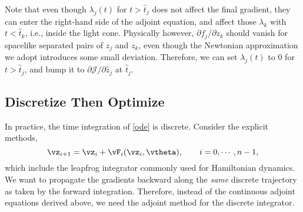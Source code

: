 \documentclass[modern, trackchanges, dvipsnames]{aastex631}
\newcommand{\p}{\partial}
\newcommand{\cJ}{\mathcal{J}}
\begin{document}
Note that even though $\lambda_j(t)$ for $t > \hat t_j$ does not affect
the final gradient, they can enter the right-hand side of the adjoint
equation, and affect those $\lambda_k$ with $t < \hat t_k$, i.e., inside
the light cone.
Physically however, $\p f_j / \p z_k$ should vanish for spacelike
separated pairs of $z_j$ and $z_k$, even though the Newtonian
approximation we adopt introduces some small deviation.
Therefore, we can set $\lambda_j(t)$ to 0 for $t > \hat t_j$, and bump
it to $\p\cJ / \p\hat z_j$ at $\hat t_j$.


\vspace{1em}
\subsection{Discretize Then Optimize}

In practice, the time integration of \eqref{ode} is discrete.
Consider the explicit methods,
%
\begin{equation}
\vz_{i+1} = \vz_i + \vF_i(\vz_i, \vtheta), \qquad i = 0, \cdots, n-1,
\label{explicit}
\end{equation}
%
which include the leapfrog integrator commonly used for Hamiltonian
dynamics.
We want to propagate the gradients backward along the \emph{same}
discrete trajectory as taken by the forward integration.
Therefore, instead of the continuous adjoint equations derived above, we
need the adjoint method for the discrete integrator.
\end{document}
